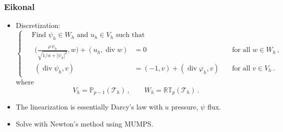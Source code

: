 \documentclass[aspectratio=169,xcolor=dvipsnames,11pt]{beamer}
\newcommand{\fa}{\text{for all }}
\begin{document}
\begin{frame}\frametitle{Eikonal}
\begin{itemize}
\item
Discretization:
\begin{equation}
\label{eq:EikonalDVF}
    \left\{
    \begin{aligned}
        &\,\text{Find }
        \psi_h \in W_h
        \text{ and }
        u_h \in V_h
        \text{ such that}
        \\
        &\,
        \begin{alignedat}{3}
            \bigg(\frac{\rho\,\psi_h}{\sqrt{1/\alpha+|\psi_h|^2}}, w\bigg) + (u_h, \operatorname{div} w)
            &= 0
            &&~\fa w \in W_h
            \,,
            \\
            (\operatorname{div}\psi_h, v)
            &=
            (-1, v) + (\operatorname{div}\varphi_h,v)
            &&~\fa v \in V_h
            \,.
        \end{alignedat}
    \end{aligned}
    \right.
\end{equation}
where
\[
    V_h = \mathbb{P}_{p-1}(\mathcal{T}_h)
    \,,
    \qquad
    W_h = \mathbb{RT}_{p}(\mathcal{T}_h)
    \,.
\]
\item The linearization is essentially Darcy's law with $u$ pressure, $\psi$ flux. 
\item Solve with Newton's method using MUMPS.
\end{itemize}
\end{frame}
\end{document}
